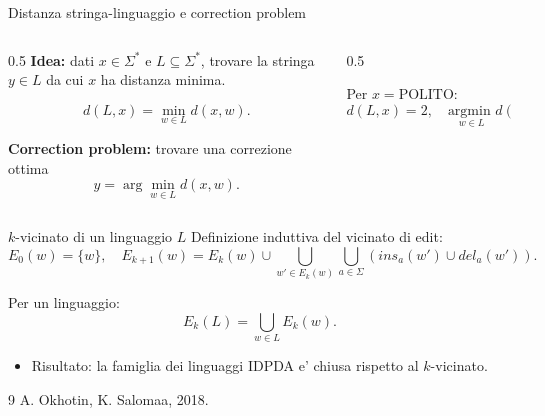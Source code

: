 \documentclass[aspectratio=169]{beamer}
\begin{document}
\begin{frame}{Distanza stringa-linguaggio e correction problem}
    \begin{columns}[T]
        \begin{column}{0.5\textwidth}
            \textbf{Idea:} dati $x \in \Sigma^*$ e $L \subseteq \Sigma^*$, trovare la stringa $y \in L$ da cui $x$ ha distanza minima.

            \vspace{1em}
            \[
                d(L,x)=\min_{w\in L} d(x,w).
            \]

            \vspace{1em}
            \textbf{Correction problem:} trovare una correzione ottima
            \[
                y=\arg\min_{w\in L} d(x,w).
            \]
        \end{column}
\begin{column}{0.5\textwidth}
            \centering

            \vspace{1em}
            Per $x=\text{POLITO}$:
            \[
                d(L,x) = 2, \quad \underset{w \in L}{\text{argmin }} d(x,w) = \text{POLIMI}
            \]
        \end{column}
    \end{columns}
\end{frame}

\begin{frame}{$k$-vicinato di un linguaggio $L$}
Definizione induttiva del vicinato di edit:
\[
E_0(w)=\{w\},\quad
E_{k+1}(w)=E_k(w)\cup\bigcup_{w'\in E_k(w)}\bigcup_{a\in\Sigma}(ins_a(w')\cup del_a(w')).
\]

Per un linguaggio:
\[
E_k(L)=\bigcup_{w\in L}E_k(w).
\]

\begin{itemize}
  \item Risultato: la famiglia dei linguaggi IDPDA e' chiusa rispetto al $k$-vicinato.
\end{itemize}

\vfill
\footnotesize
\begin{thebibliography}{9}
  A. Okhotin, K. Salomaa, 2018.
\end{thebibliography}
\end{frame}
\end{document}
